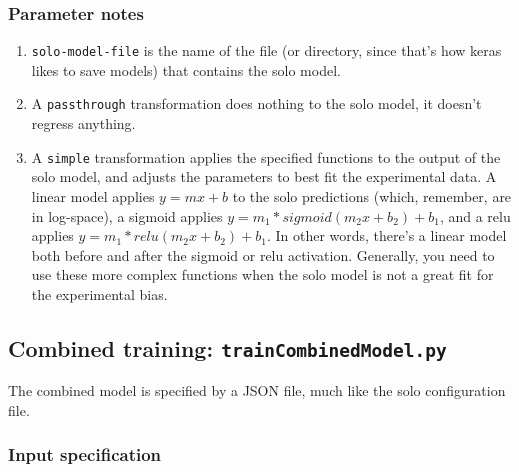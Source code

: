 \documentclass{article}
\begin{document}
\subsubsection{Parameter notes}

\begin{enumerate}
    \item \texttt{solo-model-file} is the name of the file (or directory, since that's how keras
        likes to save models) that contains the solo model.
    \item A \texttt{passthrough} transformation does nothing to the solo model, it doesn't
        regress anything.
    \item A \texttt{simple} transformation applies the specified functions to the output of the
        solo model, and adjusts the parameters to best fit the experimental data.
        A linear model applies $y=m x+b$ to the solo predictions (which, remember, are in
        log-space),
        a sigmoid applies $y = m_1 *sigmoid(m_2x+b_2) + b_1$,
        and a relu applies $y = m_1 * relu(m_2x+b_2) + b_1$.
        In other words, there's a linear model both before and after the sigmoid or relu
        activation.
        Generally, you need to use these more complex functions when the solo model is not a
        great fit for the experimental bias.
\end{enumerate}



\newpage

\subsection{Combined training: \texttt{trainCombinedModel.py}}

The combined model is specified by a JSON file, much like the solo configuration file.

\subsubsection{Input specification}
\end{document}
